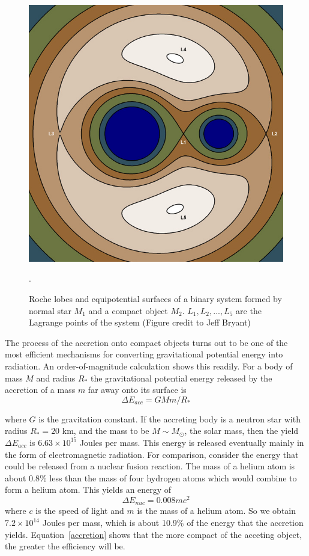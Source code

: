 \begin{figure}[ht]
    \centering
    \includegraphics[width = 0.6\linewidth]{Chapters/Figures/equipotential.png}
    \caption{Roche lobes and equipotential surfaces of a binary system formed by normal star $M_1$ and a compact object $M_2$. $L_1, L_2,..., L_5$ are the Lagrange points of the system (Figure credit to Jeff Bryant)}.
    \label{roche}
\end{figure}

 
The process of the accretion onto compact objects turns out to be one of the most efficient mechanisms for converting gravitational potential energy into radiation. An order-of-magnitude calculation shows this readily. For a body of mass $M$ and radius $R_{\ast}$ the gravitational potential energy released by the accretion of a mass $m$ far away onto its surface is 
\begin{equation}
    \Delta E_{acc} = GMm/R_{\ast}
    \label{accretion}
\end{equation}

where $G$ is the gravitation constant. If the accreting body is a neutron star with radius $R_{\ast} = 20$ km, and the mass to be $M \sim M_{\odot}$, the solar mass, then the yield $\Delta E_{acc}$ is $6.63\times 10^{15}$ Joules per mass. This energy is released eventually mainly in the form of electromagnetic radiation. For comparison, consider the energy that could be released from a nuclear fusion reaction. The mass of a helium atom is about 0.8\% less than the mass of four hydrogen atoms which would combine to form a helium atom. This yields an energy of 
\begin{equation}
    \Delta E_{nuc} = 0.008 mc^2
    \label{fusion}
\end{equation}
where $c$ is the speed of light and $m$ is the mass of a helium atom. So we obtain $7.2 \times 10^{14}$ Joules per mass, which is about 10.9\% of the energy that the accretion yields. Equation~\ref{accretion} shows that the more compact of the acceting object, the greater the efficiency will be.\par

